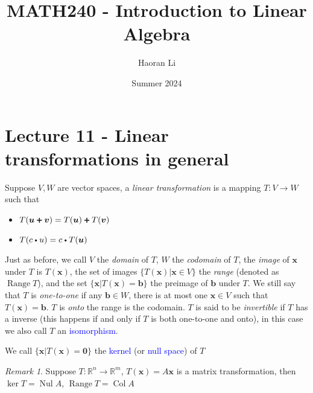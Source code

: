 \documentclass{beamer}
\title{MATH240 - Introduction to Linear Algebra}
\author{Haoran Li}
\institute[UMD]{University of Maryland, College Park}
\date{Summer 2024}
\newcommand{\fatdot}{\mathrel{\raisebox{0.25ex}{\tikz\filldraw[black,x=2pt,y=2pt] (0,0) circle (0.5);}}}
\newcommand{\fatplus}{\mathrel{\raisebox{-0.1ex}{\tikz\filldraw[black,x=2pt,y=2pt,scale=1.4] (0.9,0)--(1.1,0)--(1.1,0.9)--(2,0.9)--(2,1.1)--(1.1,1.1)--(1.1,2)--(0.9,2)--(0.9,1.1)--(0,1.1)--(0,0.9)--(0.9,0.9)--cycle;}}}
\DeclareMathOperator{\Nul}{Nul}
\DeclareMathOperator{\Col}{Col}
\DeclareMathOperator{\Range}{Range}
\theoremstyle{definition}
\theoremstyle{remark}
\newtheorem*{remark}{Remark}
\begin{document}
\maketitle

\section{Lecture 11 - Linear transformations in general}

\begin{frame}[t]
\begin{definition}
Suppose $V,W$ are vector spaces, a \textit{linear transformation} is a mapping $T:V\to W$ such that
\begin{itemize}
\item $T(\bm u\fatplus\bm v)=T(\bm u)\fatplus T(\bm v)$
\item $T(c\fatdot u)=c\fatdot T(\bm u)$
\end{itemize}
Just as before, we call $V$ the \textit{domain} of $T$, $W$ the \textit{codomain} of $T$, the \textit{image} of $\bm x$ under $T$ is $T(\bm x)$, the set of images $\{T(\bm x)|\bm x\in V\}$ the \textit{range} (denoted as $\Range T$), and the set $\{\bm x|T(\bm x)=\bm b\}$ the preimage of $\bm b$ under $T$. We still say that $T$ is \textit{one-to-one} if any $\bm b\in W$, there is at most one $\bm x\in V$ such that $T(\bm x)=\bm b$. $T$ is \textit{onto} the range is the codomain. $T$ is said to be \textit{invertible} if $T$ has a inverse (this happens if and only if $T$ is both one-to-one and onto), in this case we also call $T$ an \textcolor{blue}{isomorphism}.
\end{definition}
\end{frame}

\begin{frame}[t]
\begin{definition}
We call $\{\bm x|T(\bm x)=\bm0\}$ the \textcolor{blue}{kernel} (or \textcolor{blue}{null space}) of $T$
\end{definition}
\end{frame}

\begin{frame}[t]
\begin{remark}\label{14:24/06/30/2022}
Suppose $T:\mathbb R^n\to\mathbb R^m$, $T(\mathbf x)=A\mathbf x$ is a matrix transformation, then $\ker T=\Nul A$, $\Range T=\Col A$
\end{remark}
\end{frame}
\end{document}

